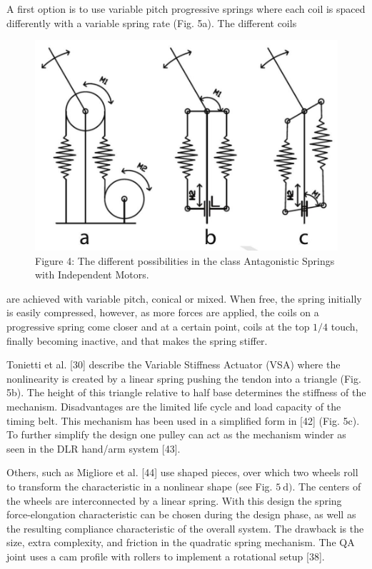 \documentclass[10pt]{article}
\begin{document}
A first option is to use variable pitch progressive springs where each coil is spaced differently with a variable spring rate (Fig. 5a). The different coils

\begin{figure}[h]
\begin{center}
  \includegraphics[width=\textwidth]{2025_09_17_f0417c8723605e4ad1efg-11}
\captionsetup{labelformat=empty}
\caption{Figure 4: The different possibilities in the class Antagonistic Springs with Independent Motors.}
\end{center}
\end{figure}

are achieved with variable pitch, conical or mixed. When free, the spring initially is easily compressed, however, as more forces are applied, the coils on a progressive spring come closer and at a certain point, coils at the top $1 / 4$ touch, finally becoming inactive, and that makes the spring stiffer.

Tonietti et al. [30] describe the Variable Stiffness Actuator (VSA) where the nonlinearity is created by a linear spring pushing the tendon into a triangle (Fig. 5b). The height of this triangle relative to half base determines the stiffness of the mechanism. Disadvantages are the limited life cycle and load capacity of the timing belt. This mechanism has been used in a simplified form in [42] (Fig. 5c). To further simplify the design one pulley can act as the mechanism winder as seen in the DLR hand/arm system [43].

Others, such as Migliore et al. [44] use shaped pieces, over which two wheels roll to transform the characteristic in a nonlinear shape (see Fig. $5 \mathrm{~d})$. The centers of the wheels are interconnected by a linear spring. With this design the spring force-elongation characteristic can be chosen during the design phase, as well as the resulting compliance characteristic of the overall system. The drawback is the size, extra complexity, and friction in the quadratic spring mechanism. The QA joint uses a cam profile with rollers to implement a rotational setup [38].
\end{document}
